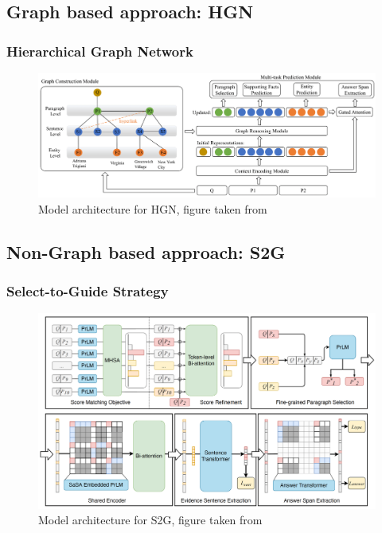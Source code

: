 \documentclass[10pt]{beamer}
\begin{document}
\subsection{Graph based approach: HGN}

\begin{frame}
  \frametitle{Hierarchical Graph Network}

  \begin{figure}[t] %
    \centering
    \includegraphics[width=\linewidth]{fig/ext_fig/hgn_diagram.png} %
    \caption{Model architecture for HGN, figure taken from \cite{RN119}}
    \label{fig:sample_hotpotqa} %
  \end{figure}

\end{frame}

\subsection{Non-Graph based approach: S2G}

\begin{frame}
  \frametitle{Select-to-Guide Strategy}

  \begin{figure}[t] %
    \centering
    \includegraphics[width=\linewidth]{fig/ext_fig/s2g_diagram.png} %
    \caption{Model architecture for S2G, figure taken from \cite{RN106}}
    \label{fig:sample_hotpotqa} %
  \end{figure}

\end{frame}
\end{document}
